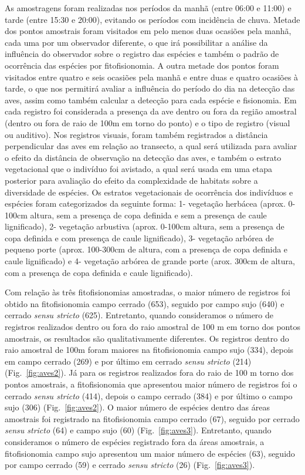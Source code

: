 As amostragens foram realizadas nos períodos da manhã (entre 06:00 e
11:00) e tarde (entre 15:30 e 20:00), evitando os períodos com
incidência de chuva. Metade dos pontos amostrais foram visitados em
pelo menos duas ocasiões pela manhã, cada uma por um observador
diferente, o que irá possibilitar a análise da influência do
observador sobre o registro das espécies e também o
padrão de ocorrência das espécies por fitofisionomia. A outra metade
dos pontos foram visitados entre quatro e seis ocasiões pela manhã e
entre duas e quatro ocasiões à tarde, o que nos permitirá avaliar a
influência do período do dia na detecção das aves, assim como também
calcular a detecção para cada espécie e fisionomia. Em cada registro
foi considerada a presença da ave dentro ou fora da região amostral
(dentro ou fora de raio de 100m em torno do ponto) e o tipo de
registro (visual ou auditivo). Nos registros visuais, foram também
registrados a distância perpendicular das aves em relação ao
transecto, a qual será utilizada para avaliar o efeito da distância de
observação na detecção das aves, e também o estrato vegetacional que o
indivíduo foi avistado, a qual será usada em uma etapa posterior para
avaliação do efeito da complexidade de habitats sobre a diversidade de
espécies. Os estratos vegetacionais de ocorrência dos indivíduos e
espécies foram categorizados da seguinte forma: 1- vegetação herbácea
(aprox. 0-100cm altura, sem a presença de copa definida e sem a presença de
caule lignificado), 2- vegetação arbustiva (aprox. 0-100cm altura, sem a
presença de copa definida e com presença de caule lignificado), 3-
vegetação arbórea de pequeno porte (aprox. 100-300cm de altura, com a
presença de copa definida e caule lignificado) e 4- vegetação arbórea
de grande porte (arox. 300cm de altura, com a presença de copa
definida e caule lignificado).

Com relação às três fitofisionomias amostradas, o maior número de
registros foi obtido na fitofisionomia campo cerrado (653), seguido
por campo sujo (640) e cerrado \textit{sensu stricto}
(625). Entretanto, quando consideramos o número de registros
realizados dentro ou fora do raio amostral de 100 m em torno dos
pontos amostrais, os resultados são qualitativamente diferentes. Os
registros dentro do raio amostral de 100m foram maiores na
fitofisionomia campo sujo (334), depois em campo cerrado (269) e por
último em cerrado \textit{sensu stricto} (214) (Fig.~\ref{fig:aves2}). Já para os
registros realizados fora do raio de 100 m torno dos pontos amostrais,
a fitofisionomia que apresentou maior número de registros foi o
cerrado \textit{sensu stricto} (414), depois o campo cerrado (384) e
por último o campo sujo (306) (Fig.~\ref{fig:aves2}). O maior número de espécies
dentro das áreas amostrais foi registrado na fitofisionomia campo
cerrado (67), seguido por cerrado \textit{sensu stricto} (64) e campo
sujo (60) (Fig.~\ref{fig:aves3}). Entretanto, quando consideramos o número de
espécies registrado fora da áreas amostrais, a fitofisionomia campo
sujo apresentou um maior número de espécies (63), seguido por campo
cerrado (59) e cerrado \textit{sensu stricto} (26) (Fig.~\ref{fig:aves3}).

